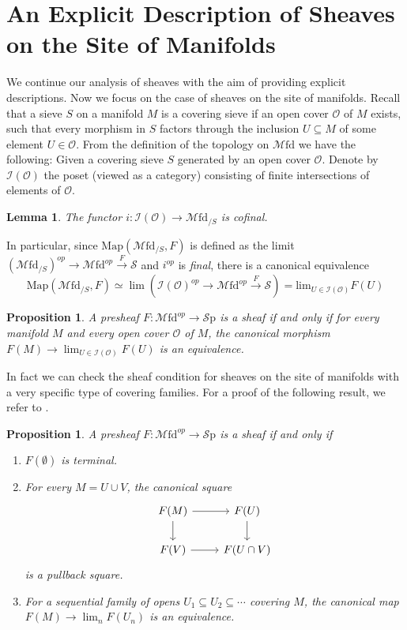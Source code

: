 \documentclass[10pt]{amsart}
\newcommand{\I}{\mathscr{I}}
\newcommand{\s}{\mathscr{S}}
\newcommand{\Map}{\mathrm{Map}}
\newcommand{\Sp}{\mathscr{S}\mathrm{p}}
\newcommand{\Mfd}{\mathscr{M}\mathrm{fd}}
\newtheorem{lemma}[equation]{Lemma}
\newtheorem{proposition}[equation]{Proposition}
\theoremstyle{definition}
\theoremstyle{remark}
\numberwithin{equation}{section}
\begin{document}
\section{An Explicit Description of Sheaves on the Site of Manifolds}
We continue our analysis of sheaves with the aim of providing explicit descriptions. Now we focus on the case of sheaves on the site of manifolds. Recall that a sieve $S$ on a manifold $M$ is a covering sieve if an open cover $\mathscr O$ of $M$ exists, such that every morphism in $S$ factors through the inclusion $U\subseteq M$ of some element $U\in\mathscr O$. From the definition of the topology on $\Mfd$ we have the following: Given a covering sieve $S$ generated by an open cover $\mathscr O$. Denote by $\I(\mathscr O)$ the poset (viewed as a category) consisting of finite intersections of elements of $\mathscr O$.
\begin{lemma}
	The functor $i:\I(\mathscr O)\rightarrow\Mfd_{/S}$ is cofinal.
\end{lemma}
In particular, since $\Map(\Mfd_{/S},F)$ is defined as the limit $(\Mfd_{/S})^{op}\to\Mfd^{op}\xrightarrow F\s$ and $i^{op}$ is \emph{final}, there is a canonical equivalence \[\Map(\Mfd_{/S},F)\simeq\lim(\I(\mathscr O)^{op}\to\Mfd^{op}\xrightarrow F\s)=\textrm{lim}_{U\in\I(\mathscr O)}F(U)\]
\begin{proposition}\label{pro:sheaf}
  A presheaf $F\colon \Mfd^{op} \to \Sp$ is a sheaf if and only if for every manifold $M$ and every open cover $\mathscr O$ of $M$, the canonical morphism $F(M) \to \lim_{U \in \I(\mathscr O)}F(U)$ is an equivalence.
\end{proposition}

In fact we can check the sheaf condition for sheaves on the site of manifolds with a very specific type of covering families. For a proof of the following result, we refer to \cite[Proposition 3.6.6]{amabeldebrayhaine2021diffcoh}.

\begin{proposition}
  A presheaf $F\colon \Mfd^{op} \to \Sp$ is a sheaf if and only if
  \begin{enumerate}
    \item $F(\emptyset)$ is terminal.
    \item For every $M = U \cup V$, the canonical square
    \[
      \begin{tikzcd}
        F(M) \ar[r] \ar[d] & F(U) \ar[d] \\
        F(V) \ar[r] & F(U \cap V)
      \end{tikzcd}
    \]is a pullback square. 
    \item For a sequential family of opens $U_1 \subseteq U_2 \subseteq \cdots$ covering $M$, the canonical map $F(M) \to \lim_{n} F(U_n)$ is an equivalence.
  \end{enumerate}
\end{proposition}
\end{document}
